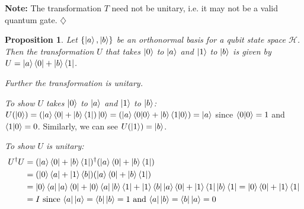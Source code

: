 \documentclass[12pt,twoside,fleqn]{report}
\makeatletter
\theoremstyle{thmstyle}
\renewenvironment{proof}[1][\proofname]{\par
\pushQED{\qed}%
\normalfont \topsep6\p@\@plus6\p@\relax
\trivlist
\item[\hskip\labelsep\itshape#1\@addpunct{.}]\mbox{}\par\nobreak\ignorespaces
}{%
    \popQED\endtrivlist\@endpefalse
    }
\newtheorem{prop}{Proposition}[chapter]
\newenvironment{note}{\textbf{Note:}}{\hfill\ensuremath{\diamondsuit}}
\makeatother
\begin{document}
\begin{note}
    The transformation $T$ need not be unitary, i.e. it may not be a valid quantum gate.
\end{note}

\begin{prop}
    \label{compbasischange}
    Let $\{ \ket{a}, \ket{b} \}$ be an orthonormal basis for a qubit state space $\mathcal{H}$.
    Then the transformation $U$ that takes $\ket{0}$ to $\ket{a}$ and $\ket{1}$ to $\ket{b}$ is given by $U = \ket{a}\bra{0} + \ket{b}\bra{1}$.

    Further the transformation is unitary.
\end{prop}
\begin{proof}
    \emph{To show $U$ takes $\ket{0}$ to $\ket{a}$ and $\ket{1}$ to $\ket{b}$:} \\
    $U (\ket{0}) = (\ket{a}\bra{0} + \ket{b}\bra{1}) \ket{0} = (\ket{a} \braket{0|0} + \ket{b} \braket{1|0}) = \ket{a}$ since $\braket{0|0} = 1$ and $\braket{1|0} = 0$.
    Similarly, we can see $U(\ket{1}) = \ket{b}$.

    \emph{To show $U$ is unitary:}\\
    \begin{align*}
        U^\dagger U & =  (\ket{a}\bra{0} + \ket{b}\bra{1})^\dagger (\ket{a}\bra{0} + \ket{b}\bra{1}) 
        \\ & = (\ket{0}\bra{a} + \ket{1}\bra{b})(\ket{a}\bra{0} + \ket{b}\bra{1}) 
        \\ & = \ket{0}\bra{a}\ket{a}\bra{0} + \ket{0}\bra{a}\ket{b}\bra{1} + \ket{1}\bra{b}\ket{a}\bra{0} + \ket{1}\bra{1}\ket{b}\bra{1} = \ket{0}\bra{0} + \ket{1}\bra{1} 
        \\ & = I \text{ since $\bra{a}\ket{a} = \bra{b} \ket{b} = 1$ and $\bra{a}\ket{b} = \bra{b}\ket{a} = 0$}
    \end{align*}
\end{proof}
\end{document}
